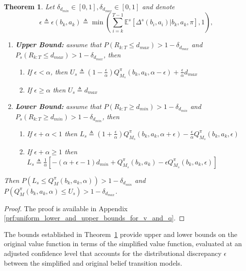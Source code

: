 \documentclass[acmlarge, manuscript, screen, review, natbib=false, oneside]{acmart}
\newtheorem{theorem}{Theorem}[section]
\begin{document}
\begin{theorem}\label{thm:uniform_lower_and_upper_bounds_for_v_and_q}
	Let $\delta_{d_{min}}\in [0, 1], \delta_{d_{max}}\in [0, 1]$ and denote 
	\begin{equation}\label{eq:epsilon}
		\epsilon \triangleq \epsilon(b_k, a_k) \triangleq \min(\sum_{i=k}^{T-1} \mathbb{E}^s[\Delta^s(b_i, a_i)|b_k, a_k,\pi], 1),
	\end{equation}
	\begin{enumerate}
		\item \textbf{Upper Bound:} assume that $P(R_{k:T}\leq d_{max})>1-\delta_{d_{max}}$ and $P_s(R_{k:T}\leq d_{max})>1-\delta_{d_{max}}$, then \begin{enumerate}
			\item If $\epsilon<\alpha$, then
			$U_s\triangleq (1-\frac{\epsilon}{\alpha}) Q^\pi_{M_s}(b_k,a_k,\alpha-\epsilon) + \frac{\epsilon}{\alpha}d_{max}$
			\item If $\epsilon \geq \alpha$ then $U_s\triangleq d_{max}$
		\end{enumerate}
		\item \textbf{Lower Bound:} assume that $P(R_{k:T}\geq d_{min})>1-\delta_{d_{min}}$ and $P_s(R_{k:T}\geq d_{min})>1-\delta_{d_{min}}$, then \begin{enumerate}
			\item If $\epsilon + \alpha < 1$ then 
			$
			L_s\triangleq (1+\frac{\epsilon}{\alpha}) Q^\pi_{M_s}(b_k,a_k,\alpha+\epsilon) - \frac{\epsilon}{\alpha} Q^\pi_{M_s}(b_k,a_k, \epsilon)
			$
			\item If $\epsilon + \alpha \geq 1$ then 
			$
			L_s\triangleq\frac{1}{\alpha}[-(\alpha + \epsilon - 1)
			d_{min}+Q^\pi_{M_s}(b_k,a_k)-\epsilon Q^\pi_{M_s}(b_k,a_k,\epsilon)]
			$
		\end{enumerate}
	\end{enumerate}
	Then $P(L_s \leq Q_M^\pi(b_k, a_k,\alpha)) > 1-\delta_{d_{min}}$ and $P(Q_M^\pi(b_k, a_k,\alpha)\leq U_s)> 1-\delta_{d_{max}}$.
\end{theorem}
\begin{proof}
	The proof is available in Appendix \ref{prf:uniform_lower_and_upper_bounds_for_v_and_q}.
\end{proof}
The bounds established in  Theorem~\ref{thm:uniform_lower_and_upper_bounds_for_v_and_q} provide upper and lower bounds on the original value function in terms of the simplified value function, evaluated at an adjusted confidence level that accounts for the distributional discrepancy $\epsilon$ between the simplified and original belief transition models.
\end{document}
